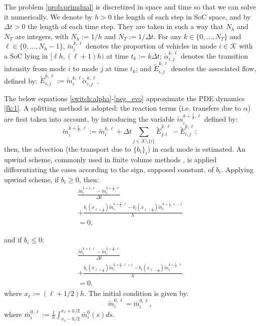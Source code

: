 \documentclass[conference]{IEEEtran}
\def\K{\mathcal{K}}
\begin{document}
The problem \eqref{prob:primdual} is discretized in space and time so that we can solve it numerically. We denote by $h>0$ the length of each step in SoC space, and by $\Delta t>0$ the length of each time step.
They are taken in such a way that $N_h$ and $N_T$ are integers, with $N_h:=1/h$ and $N_T:=1/\Delta t$. For any $k\in\{0,\ldots,N_T\}$ and $\ell\in\{0,\ldots,N_h-1\}$,
 $\tilde{m}_i^{k,\ell}$ denotes the proportion of vehicles in mode $i\in\K$ with a SoC lying in $[\ell h, (\ell+1)h)$ at time $t_k:=k\Delta t$; $\tilde{\alpha}_{i,j}^{k,\ell}$
 denotes the transition intensity from mode $i$ to mode $j$ at time $t_k$; and $\tilde{E}_{i,j}^{k,\ell}$ denotes the associated flow, defined by: $\tilde{E}_{i,j}^{k,\ell}:=\tilde{m}_i^{k,\ell}\tilde{\alpha}_{i,j}^{k,\ell}$.
 
 The below equations \eqref{switch:alpha}-\eqref{neg_evo} approximate the PDE  dynamics \eqref{fk:1}. A splitting method is adopted: the reaction terms (i.e. transfers due to $\alpha$) are first taken into account, by introducing the variable $\tilde{m}^{k+\frac{1}{2},\ell}_i$ defined by:
\begin{equation}
\label{switch:alpha}
\tilde{m}^{k+\frac{1}{2},\ell}_i := \tilde{m}^{k,\ell}_i +\Delta t \sum_{j\in \K\setminus \{i\}} \tilde{E}_{j,i}^{k,\ell}-\tilde{E}_{i,j}^{k,\ell};
\end{equation}
then, the advection (the transport due to $\{b_i\}_{i}$) in each mode is estimated. An upwind scheme, commonly used in finite volume methods \cite{perthame2003equations}, is applied  differentiating the cases according to the sign, supposed constant, of $b_i$. Applying upwind scheme, if $b_i\geq0$, then:
\begin{equation}
\begin{array}{l}
\label{pos_evo}
 \frac{\tilde{m}^{k+1,\ell}_i-\tilde{m}^{k+\frac{1}{2},\ell}_i}{\Delta t}\\
+ 
\frac{b_i(x_{\ell+\frac{1}{2}})\tilde{m}^{k+\frac{1}{2},\ell}_i -
b_i(x_{\ell-\frac{1}{2}})\tilde{m}^{k+\frac{1}{2},\ell-1}_i} {h}\\
= 0,
\end{array}
\end{equation}

and if $b_i\leq0$:
\begin{equation}
\label{neg_evo}
\begin{array}{l}
 \frac{\tilde{m}^{k+1,\ell}_i-\tilde{m}^{k+\frac{1}{2},\ell}_i}{\Delta t}\\
+ 
\frac{
b_i(x_{\ell+\frac{1}{2}})\tilde{m}^{k+\frac{1}{2},\ell+1}_i - b_i(x_{\ell-\frac{1}{2}}) \tilde{m}^{k+\frac{1}{2},\ell}_i} {h}\\
= 0,
\end{array}
\end{equation}
 where $x_{\ell} :=(\ell+1/2)h$. 
 The initial condition is given by:
 \begin{equation}
 \label{init_cond}
 \tilde{m}_i^{0,\ell} = \bar{m}^{0,\ell}_i,
 \end{equation}
where  $\bar{m}^{0,\ell}_i:=\frac{1}{h}\int_{x_\ell -h/2}^{x_\ell + h/2}\bar{m}^0_i(s)ds$.
\end{document}
